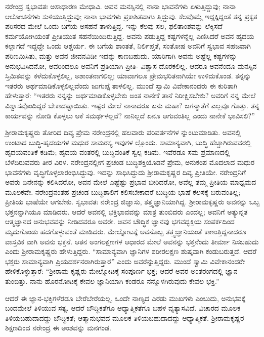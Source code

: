 ನರೇಂದ್ರ ಸ್ವಭಾವತಃ ಅಸಾಧಾರಣ ಮೇಧಾವಿ. ಅವನ ಮನಸ್ಸಿನಲ್ಲಿ ನಾನಾ ಭಾವನೆಗಳು ಏಳುತ್ತಿದ್ದುವು; ನಾನಾ ಆಲೋಚನೆಗಳು ಸುಳಿಯುತ್ತಿದ್ದುವು; ನಾನಾ ಭಾವಗಳು ಪ್ರಕಾಶಿತವಾಗು ತ್ತಿದ್ದುವು. ಕೆಲವೊಮ್ಮೆ ಇದ್ದಕ್ಕಿದ್ದಂತೆ ತನ್ನ ಪ್ರಕೃತ ಪರಿಸರದ ಮೇಲೆ ಒಂದು ಬಗೆಯ ಅಸಹನೆ ತಾಳುತ್ತಿದ್ದ. ಇನ್ನು ಕೆಲವು ಸಲ, ಫಲಿತಾಂಶವನ್ನು ಲೆಕ್ಕಿಸದೆ ಕರ್ಮಯೋಗಿಯಂತೆ ಪ್ರೀತಿಯುತ ಸಹನೆಯಿಂದಿರುತ್ತಿದ್ದ. ಅವನು ಪಡುತ್ತಿದ್ದ ಕಷ್ಟಗಳನ್ನೆಲ್ಲ ಎಣಿಸಿದರೆ ಅವನ ಹೃದಯ ಕಲ್ಲಾಗದೆ ಇದ್ದದ್ದೇ ಒಂದು ಆಶ್ಚರ್ಯ. ಈ ಬಗೆಯ ಶಾಂತತೆ, ನಿರ್ಲಿಪ್ತತೆ, ಸಂತೋಷ ಅವನಿಗೆ ಸ್ವಭಾವ ಸಹಜವಾಗಿ ಪರಿಣಮಿಸಿತು, ಮತ್ತು ಅವನ ಜೀವನವಿಡೀ ಇದನ್ನು ಕಾಣಬಹುದು. ಯಾರಿಗಾಗಿ ಅವನು ಅಷ್ಟೆಲ್ಲ ಕಷ್ಟಗಳನ್ನು ಅನುಭವಿಸಿದನೋ, ಅವರಿಂದಲೂ ಅವನಿಗೆ ಪ್ರತಿಯಾಗಿ ಪ್ರೀತಿ- ವಿಶ್ವಾಸ ದೊರಕಲಿಲ್ಲ. ಆದರೂ ಅವನೆಂದೂ ಮನಸ್ಸಿನ ಸ್ತಿಮಿತವನ್ನು ಕಳೆದುಕೊಳ್ಳಲಿಲ್ಲ, ಅಶಾಂತನಾಗಲಿಲ್ಲ; ಯಾವಾಗಲೂ ಪ್ರೇಮಭರಿತನಾಗಿಯೇ ಉಳಿದುಕೊಂಡ. ತನ್ನನ್ನು ಇತರರು ಅರ್ಥಮಾಡಿಕೊಳ್ಳಲಿಲ್ಲವೆಂದು ಜುಗುಪ್ಸೆ ತಾಳಲಿಲ್ಲ. ಮುಂದೆ ಸ್ವಾಮಿ ವಿವೇಕಾನಂದರು ಈ ಕುರಿತಾಗಿ ಹೇಳುತ್ತಾರೆ: “ಇತರರು ನನ್ನನ್ನು ಅರ್ಥಮಾಡಿಕೊಳ್ಳಬೇಕು ಅಂತ ನಾನೇಕೆ ತಾನೆ ನಿರೀಕ್ಷಿಸಬೇಕು? ಅವರಿಗೆ ನನ್ನ ಮೇಲೆ ವಿಶ್ವಾಸವೊಂದಿದ್ದರೆ ಬೇಕಾದಷ್ಟಾಯಿತು. ಇಷ್ಟರ ಮೇಲೆ ನಾನಾದರೂ ಏನು ಮಹಾ? ಜಗನ್ಮಾತೆಗೆ ಎಲ್ಲವೂ ಗೊತ್ತು. ತನ್ನ ಕಾರ್ಯವನ್ನು ನೋಡಿ ಕೊಳ್ಳಲು ಆಕೆ ಸಮರ್ಥಳಲ್ಲವೆ? ನಾನಿಲ್ಲದೆ ಏನೂ ಆಗುವಂತಿಲ್ಲ ಎಂದು ನಾನೇಕೆ ಭಾವಿಸಲಿ?”

ಶ್ರೀರಾಮಕೃಷ್ಣರು ತೋರಿದ ದಿವ್ಯ ಪ್ರೇಮ ನರೇಂದ್ರನಲ್ಲಿ ಹಲವಾರು ಪರಿವರ್ತನೆಗಳ ನ್ನುಂಟುಮಾಡಿತು. ಅವನಲ್ಲಿ ಉಂಟಾದ ಬುದ್ಧಿ-ಹೃದಯಗಳ ಮಧುರ ಸಾಮರಸ್ಯ ಇವುಗಳ ಲ್ಲೊಂದು. ಸಾಮಾನ್ಯವಾಗಿ, ಬುದ್ಧಿ ಹೆಚ್ಚಾಗಿರುವವರಲ್ಲಿ ಹೃದಯವಂತಿಕೆ ಕಡಿಮೆ; ಹೃದಯ ವಂತರಲ್ಲಿ ಬುದ್ಧಿವಂತಿಕೆ ಸ್ವಲ್ಪ ಕಡಿಮೆ. ಇವೆರಡೂ ಸಮ ಪ್ರಮಾಣದಲ್ಲಿ ಬೆಳೆದಿರುವವರು ತೀರ ವಿರಳ. ನರೇಂದ್ರನಲ್ಲೀಗ ಪ್ರಚಂಡ ಬುದ್ಧಿಶಕ್ತಿಯೊಡನೆ ಪ್ರೇಮ, ಅನುಕಂಪ ಮೊದಲಾದ ಮಧುರ ಭಾವನೆಗಳು ವೃದ್ಧಿಗೊಳ್ಳಲಾರಂಭಿಸಿದ್ದುವು. ಇದನ್ನು ಸಾಧಿಸಿದ್ದುದು ಶ್ರೀರಾಮಕೃಷ್ಣರ ದಿವ್ಯ ಪ್ರೀತಿಯೇ. ನರೇಂದ್ರನಿಗೆ ಅವರು ಏನೇನನ್ನು ಕಲಿಸಿದರೋ, ಅವನ ಮೇಲೆ ಎಷ್ಟೆಷ್ಟು ಪ್ರಭಾವ ಬೀರಿದರೋ, ಅವೆಲ್ಲ ತಮ್ಮ ಪ್ರೀತಿಯ ಮಾಧ್ಯಮದ ಮೂಲಕವೇ. ನರೇಂದ್ರನಂತಹ ಪ್ರಚಂಡ ಬುದ್ಧಿಶಾಲಿಗೆ ಕಲಿಸಬೇಕಾದರೆ ಬುದ್ಧಿಯ ಭಾಷೆ ಕೆಲಸಕ್ಕೆ ಬರುವಂತಿಲ್ಲ; ಪ್ರೀತಿಯ ಭಾಷೆಯೇ ಆಗಬೇಕು. ಸ್ವಭಾವತಃ ನರೇಂದ್ರ ಜಿಜ್ಞಾಸು, ತತ್ತ್ವಜ್ಞಾನಿಯಾಗಿದ್ದ. ಶ್ರೀರಾಮಕೃಷ್ಣರು ಅವನನ್ನು ಒಬ್ಬ ಭಕ್ತನನ್ನಾಗಿಯೂ ಮಾಡಿದರು. ಆದರೆ ಅವನಲ್ಲಿ ಭಕ್ತಿಭಾವವನ್ನು ಮಾತ್ರ ತುಂಬಿದರು ಎಂದಲ್ಲ; ಅವನಿಗೆ ಅತ್ಯುನ್ನತ ಆತ್ಮಜ್ಞಾನದ ಅನುಭವವನ್ನು ನೀಡಿದವರೂ ಅವರೇ. ಅವನ ಬೌದ್ಧಿಕ ಜ್ಞಾನವು ಭಗವದ್ಭಕ್ತಿಯ ಸಂಪರ್ಕದಿಂದ ಮೃದುಗೊಂಡು ಹದಗೊಳ್ಳುವಂತೆ ಮಾಡಿದರು. ಮೇಲ್ನೋಟಕ್ಕೆ ಅವನೊಬ್ಬ ತತ್ತ್ವಜ್ಞಾನಿಯಂತೆ ಕಾಣುತ್ತಿದ್ದನಾದರೂ ವಾಸ್ತವಿಕ ವಾಗಿ ಅವನು ಭಕ್ತನೆ. ಆತನ ಅಂಗಲಕ್ಷಣಗಳ ಆಧಾರದ ಮೇಲೆ ಅವನನ್ನು ಭಕ್ತನೆಂದು ತೀರ್ಮಾ ನಿಸಬಹುದು ಎಂದು ಶ್ರೀರಾಮಕೃಷ್ಣರು ಹೇಳುತ್ತಿದ್ದರು. “ಸಾಮಾನ್ಯವಾಗಿ ಜ್ಞಾನಿಗಳ ಶರೀರಲಕ್ಷಣ ಶುಷ್ಕವಾಗಿ ಕಂಡುಬರುತ್ತದೆ. ಆದರೆ ಭಕ್ತರು ಸಾಮಾನ್ಯವಾಗಿ ಪ್ರಿಯದರ್ಶನರಾಗಿರುತ್ತಾರೆ” ಎಂದು ಅವರೆನ್ನುತ್ತಿದ್ದರು. ಮುಂದೆ ಸ್ವಾಮಿ ವಿವೇಕಾನಂದರೇ ಹೇಳಿಕೊಳ್ಳುತ್ತಾರೆ: “ಶ್ರೀರಾಮ ಕೃಷ್ಣರು ಮೇಲ್ನೋಟಕ್ಕೆ ಸಂಪೂರ್ಣ ಭಕ್ತ; ಆದರೆ ಅವರ ಅಂತರಂಗದಲ್ಲಿ ಜ್ಞಾನ ತುಂಬಿತ್ತು. ನಾನು ಹೊರನೋಟಕ್ಕೆ ಕೇವಲ ಜ್ಞಾನಿಯಾಗಿ ಕಂಡರೂ ನನ್ನೊಳಗಿರುವುದು ಕೇವಲ ಭಕ್ತಿ.”

ಆದರೆ ಈ ಜ್ಞಾನ-ಭಕ್ತಿಗಳೆರಡೂ ಬೇರೆಬೇರೆಯಲ್ಲ, ಒಂದೇ ನಾಣ್ಯದ ಎರಡು ಮುಖಗಳು ಎಂಬುದು, ಅನುಭವಕ್ಕೆ ಬಂದಮೇಲೆ ತಿಳಿಯುವ ಸತ್ಯ. ಆದರೆ ಬೌದ್ಧಿಕತೆಗೂ ಆಧ್ಯಾತ್ಮಿಕತೆಗೂ ಬಹಳ ವ್ಯತ್ಯಾಸವಿದೆ. ವಿಚಾರದ ಮೂಲಕ ತಿಳಿಯಬಹುದಾದದ್ದು ಬೌದ್ಧಿಕತೆ; ಆತ್ಮಾನುಭವದ ಮೂಲಕ ತಿಳಿಯಬಹುದಾದದ್ದು ಆಧ್ಯಾತ್ಮಿಕತೆ. ಶ್ರೀರಾಮಕೃಷ್ಣರ ಶಿಕ್ಷಣದಿಂದ ನರೇಂದ್ರ ಈ ಅಂಶವನ್ನು ಮನಗಂಡ.

